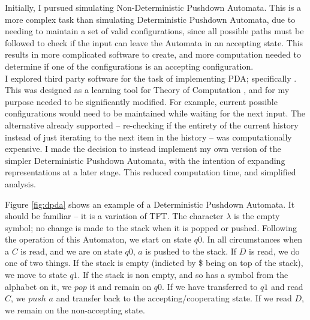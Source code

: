 \documentclass[a4paper,11pt,bcshonoursthesis,singlespace,oneside,thesisdraft,pdflatex]{cssethesis}
\renewcommand{\cite}{\citep} %
\begin{document}
Initially, I pursued simulating Non-Deterministic Pushdown Automata. 
This is a more complex task than simulating Deterministic Pushdown Automata, due to needing to maintain a set of valid configurations, since all possible paths must be followed to check if the input can leave the Automata in an accepting state. 
This results in more complicated software to create, and more computation needed to determine if one of the configurations is an accepting configuration. \\

I explored third party software for the task of implementing PDA; specifically \citet{JFLAP}. 
This was designed as a learning tool for Theory of Computation \cite{rodger2009increasing}, and for my purpose needed to be significantly modified. For example, current possible configurations would need to be maintained while waiting for the next input. The alternative already supported -- re-checking if the entirety of the current history instead of just iterating to the next item in the history -- was computationally expensive.  I made the decision to instead implement my own version of the simpler Deterministic Pushdown Automata, with the intention of expanding representations at a later stage. 
This reduced computation time, and simplified analysis. 

Figure \ref{fig:dpda} shows an example of a Deterministic Pushdown Automata. 
It should be familiar -- it is a variation of TFT. 
The character $\lambda$ is the empty symbol; no change is made to the stack when it is popped or pushed. Following the operation of this Automaton, we start on state $q0$. In all circumstances when a $C$ is read, and we are on state $q0$, $a$ is pushed to the stack. 
If $D$ is read, we do one of two things. If the stack is empty (indicted by \$ being on top of the stack), we move to state $q1$. 
If the stack is non empty, and so has a symbol from the alphabet on it, we $pop$ it and remain on $q0$. 
If we have transferred to $q1$ and read $C$, we $push$ $a$ and transfer back to the accepting/cooperating state. 
If we read $D$, we remain on the non-accepting state.
\end{document}
